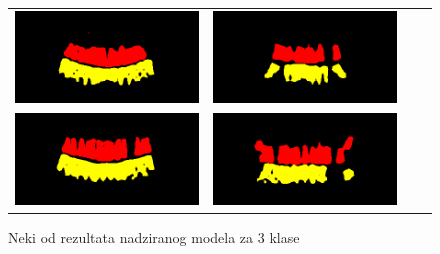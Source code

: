 \begin{figure}
\begin{tabular}{cccc}
\hspace{-1.5cm}
{\includegraphics[width = 8cm]{slike/rezultati/super3klase1.png}} &
{\includegraphics[width = 8cm]{slike/rezultati/super3klase2.png}}\\
\hspace{-1.5cm}
{\includegraphics[width = 8cm]{slike/rezultati/super3klase3.png}} &
{\includegraphics[width = 8cm]{slike/rezultati/super3klase4.png}}\\
\end{tabular}
\caption{Neki od rezultata nadziranog modela za 3 klase}
\end{figure}

